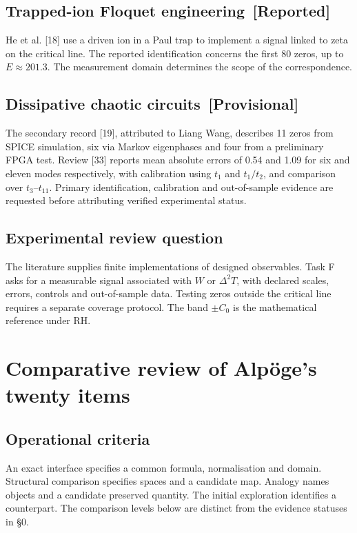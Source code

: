 \documentclass[11pt,a4paper]{article}
\newcommand{\estatuto}[1]{{\normalfont\small\color{tag}\,[#1]}}
\begin{document}
\subsection{Trapped-ion Floquet engineering \estatuto{Reported}}
He et al. [18] use a driven ion in a Paul trap to implement a signal linked to zeta on the critical line. The reported identification concerns the first 80 zeros, up to $E\approx201.3$. The measurement domain determines the scope of the correspondence.
\subsection{Dissipative chaotic circuits \estatuto{Provisional}}
The secondary record [19], attributed to Liang Wang, describes 11 zeros from SPICE simulation, six via Markov eigenphases and four from a preliminary FPGA test. Review [33] reports mean absolute errors of 0.54 and 1.09 for six and eleven modes respectively, with calibration using $t_1$ and $t_1/t_2$, and comparison over $t_3$--$t_{11}$. Primary identification, calibration and out-of-sample evidence are requested before attributing verified experimental status.
\subsection{Experimental review question}
The literature supplies finite implementations of designed observables. Task F asks for a measurable signal associated with $W$ or $\Delta^2T$, with declared scales, errors, controls and out-of-sample data. Testing zeros outside the critical line requires a separate coverage protocol. The band $\pm C_0$ is the mathematical reference under RH.
\section{Comparative review of Alpöge's twenty items}
\subsection{Operational criteria}
An exact interface specifies a common formula, normalisation and domain. Structural comparison specifies spaces and a candidate map. Analogy names objects and a candidate preserved quantity. The initial exploration identifies a counterpart. The comparison levels below are distinct from the evidence statuses in §0.
\end{document}
